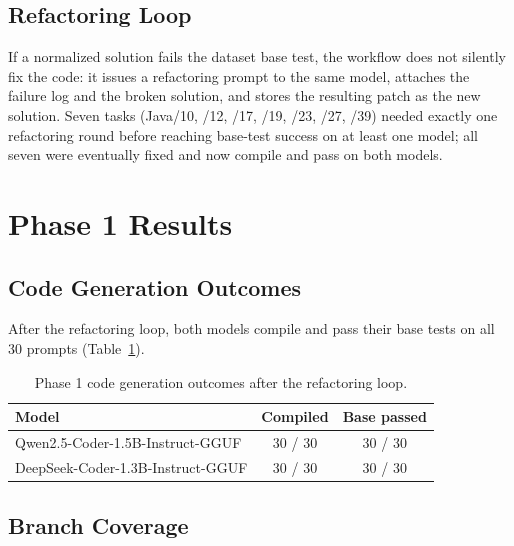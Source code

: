 \documentclass[journal]{IEEEtran}
\begin{document}
\subsection{Refactoring Loop}

If a normalized solution fails the dataset base test, the workflow does
not silently fix the code: it issues a refactoring prompt to the same
model, attaches the failure log and the broken solution, and stores the
resulting patch as the new solution. Seven tasks (Java/10, /12, /17, /19,
/23, /27, /39) needed exactly one refactoring round before reaching
base-test success on at least one model; all seven were eventually fixed
and now compile and pass on both models.

\section{Phase 1 Results}\label{sec:phase1-results}

\subsection{Code Generation Outcomes}

After the refactoring loop, both models compile and pass their base
tests on all 30 prompts (Table~\ref{tab:codegen-final}).

\begin{table}[!t]
\renewcommand{\arraystretch}{1.15}
\caption{Phase 1 code generation outcomes after the refactoring loop.}
\label{tab:codegen-final}
\centering
\footnotesize
\begin{tabular}{@{}lcc@{}}
\toprule
\textbf{Model} & \textbf{Compiled} & \textbf{Base passed} \\
\midrule
Qwen2.5-Coder-1.5B-Instruct-GGUF    & 30 / 30 & 30 / 30 \\
DeepSeek-Coder-1.3B-Instruct-GGUF   & 30 / 30 & 30 / 30 \\
\bottomrule
\end{tabular}
\end{table}

\subsection{Branch Coverage}
\end{document}
